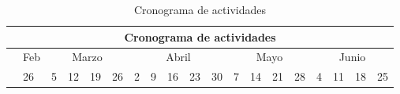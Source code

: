 \begin{table}[H]
\caption{Cronograma de actividades}
\begin{turn}{90}
\begin{tabular}{@{}llllllllllllllllllll@{}}
\toprule
\multicolumn{20}{c}{Cronograma de actividades}                                                                                                                                                                                                                                                                                                                                                                                                                                                                                                                                                                                                                                                                                                                                                                         \\ \midrule
\multicolumn{2}{l}{}                                                                                                                                                             & \multicolumn{1}{|l|}{Feb}                      & \multicolumn{4}{c|}{Marzo}                                                                                                                            & \multicolumn{5}{c|}{Abril}                                                                                                                                & \multicolumn{4}{c|}{Mayo}                                                                                                      & \multicolumn{4}{c|}{Junio}                                                                                                     \\ \cmidrule(l){3-20} 
\multicolumn{2}{l}{\multirow{-2}{*}{}}                                                                                                                                           & \multicolumn{1}{|l|}{26}                       & 5                                               & 12                       & 19                       & \multicolumn{1}{l|}{26}                       & 2                        & 9                        & 16                       & 23                       & \multicolumn{1}{l|}{30}                       & 7                        & 14                       & 21                       & \multicolumn{1}{l|}{28}                       & 4                                             & 11                       & 18                       & 25                       \\ \midrule

\end{tabular}
\end{turn}
\end{table}
